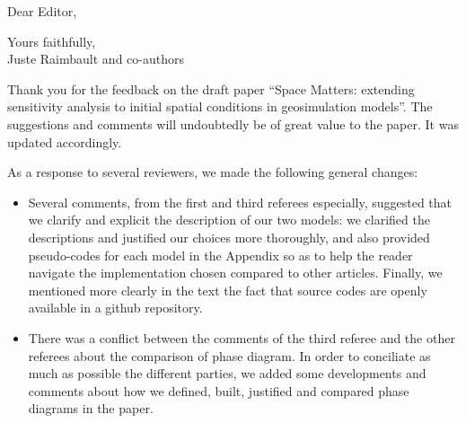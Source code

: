 \documentclass[11pt,a4paper,sans]{moderncv}        %
\begin{document}
\date{\today}
\opening{Dear Editor,}
\closing{Yours faithfully,\\
Juste Raimbault and co-authors%
}

\makelettertitle



\justify


Thank you for the feedback on the draft paper ``Space Matters: extending sensitivity analysis to initial spatial conditions in geosimulation models''. The suggestions and comments will undoubtedly be of great value to the paper. It was updated accordingly.

\medskip







As a response to several reviewers, we made the following general changes:

\begin{itemize}
	\item Several comments, from the first and third referees especially, suggested that we clarify and explicit the description of our two models: we clarified the descriptions and justified our choices more thoroughly, and also provided pseudo-codes for each model in the Appendix so as to help the reader navigate the implementation chosen compared to other articles. Finally, we mentioned more clearly in the text the fact that source codes are openly available in a github repository.
    \item There was a conflict between the comments of the third referee and the other referees about the comparison of phase diagram. In order to conciliate as much as possible the different parties, we added some developments and comments about how we defined, built, justified and compared phase diagrams in the paper.
    \end{itemize}
\end{document}
